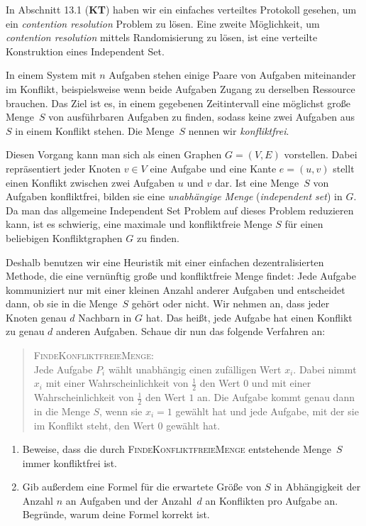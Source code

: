 \documentclass{uebung_cs}
\begin{document}
\begin{aufgabe}
	In Abschnitt 13.1 (\textbf{KT}) haben wir ein einfaches verteiltes Protokoll gesehen, um ein \textit{contention resolution} Problem zu lösen. Eine zweite Möglichkeit, um \textit{contention resolution} mittels Randomisierung zu lösen, ist eine verteilte Konstruktion eines Independent Set.

	In einem System mit $n$ Aufgaben stehen einige Paare von Aufgaben miteinander im Konflikt, beispielsweise wenn beide Aufgaben Zugang zu derselben Ressource brauchen. Das Ziel ist es, in einem gegebenen Zeitintervall eine möglichst große Menge~$S$ von ausführbaren Aufgaben zu finden, sodass keine zwei Aufgaben aus $S$ in einem Konflikt stehen. Die Menge~$S$ nennen wir \textit{konfliktfrei}.
	
	Diesen Vorgang kann man sich als einen Graphen $G = (V,E)$ vorstellen. Dabei repräsentiert jeder Knoten $v \in V$ eine Aufgabe und eine Kante $e = (u,v)$ stellt einen Konflikt zwischen zwei Aufgaben $u$ und $v$ dar. Ist eine Menge~$S$ von Aufgaben konfliktfrei, bilden sie eine \emph{unabhängige Menge} (\emph{independent set}) in $G$. 
	Da man das allgemeine Independent Set Problem auf dieses Problem reduzieren kann, ist es schwierig, eine maximale und konfliktfreie Menge $S$ für einen beliebigen Konfliktgraphen $G$ zu finden. 
	
	Deshalb benutzen wir eine Heuristik mit einer einfachen dezentralisierten Methode, die eine vernünftig große und konfliktfreie Menge findet: Jede Aufgabe kommuniziert nur mit einer kleinen Anzahl anderer Aufgaben und entscheidet dann, ob sie in die Menge~$S$ gehört oder nicht.
	Wir nehmen an, dass jeder Knoten genau $d$ Nachbarn in $G$ hat. Das heißt, jede Aufgabe hat einen Konflikt zu genau $d$ anderen Aufgaben. Schaue dir nun das folgende Verfahren an:
	
	\begin{quote}
		\textsc{FindeKonfliktfreieMenge}: \\
		Jede Aufgabe $P_i$ wählt unabhängig einen zufälligen Wert $x_i$. Dabei nimmt $x_i$ mit einer Wahrscheinlichkeit von $\frac{1}{2}$ den Wert $0$ und mit einer Wahrscheinlichkeit von $\frac{1}{2}$ den Wert $1$ an. Die Aufgabe kommt genau dann in die Menge $S$, wenn sie $x_i = 1$ gewählt hat und jede Aufgabe, mit der sie im Konflikt steht, den Wert $0$ gewählt hat.
	\end{quote}
	
		\begin{enumerate}
		\item Beweise, dass die durch \textsc{FindeKonfliktfreieMenge} entstehende Menge~$S$ immer konfliktfrei ist.
		\item Gib außerdem eine Formel für die erwartete Größe von $S$ in Abhängigkeit der Anzahl $n$ an Aufgaben und der Anzahl~$d$ an Konflikten pro Aufgabe an. Begründe, warum deine Formel korrekt ist.
	\end{enumerate}
\end{aufgabe}
\end{document}
